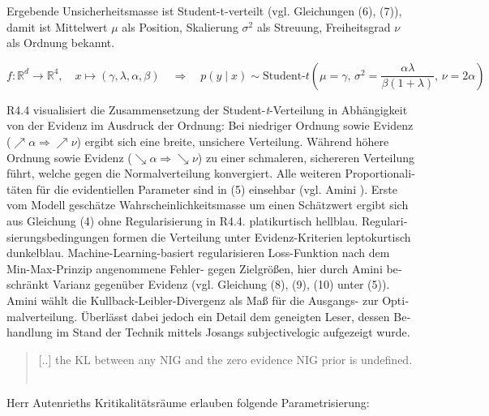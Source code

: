 \begin{otherlanguage}{ngerman}
Ergebende Unsicherheitsmasse ist Student-t-verteilt (vgl. Gleichungen (6), (7)), damit ist Mittelwert $\mu$ als \glqq{}Position\grqq{}, Skalierung $\sigma^{2}$ als \glqq{}Streuung\grqq{}, Freiheitsgrad $\nu$ als \glqq{}Ordnung\grqq{} bekannt. 

\[
f : \mathbb{R}^d \to \mathbb{R}^4, \quad x \mapsto (\gamma, \lambda, \alpha, \beta) \quad \Rightarrow \quad p(y \mid x) \sim \text{Student-}t\left(\mu = \gamma,\, \sigma^2 = \frac{\alpha \lambda}{\beta (1 + \lambda)},\, \nu = 2\alpha\right)
\]

R4.4 visualisiert die Zusammensetzung der Student-\emph{t}-Verteilung in Abhängigkeit von der Evidenz im Ausdruck der Ordnung: Bei niedriger Ordnung sowie Evidenz (\(\nearrow \alpha \Rightarrow \nearrow \nu\)) ergibt sich eine breite, unsichere Verteilung. Während höhere Ordnung sowie Evidenz (\(\searrow \alpha \Rightarrow \searrow \nu\)) zu einer schmaleren, sichereren Verteilung führt, welche gegen die Normalverteilung konvergiert. Alle weiteren Proportionalitäten für die evidentiellen Parameter sind in (5) einsehbar (vgl. Amini \parencite{amini2020}). Erste vom Modell geschätze Wahrscheinlichkeitsmasse um einen Schätzwert ergibt sich aus Gleichung (4) ohne Regularisierung in R4.4. platikurtisch hellblau. Regularisierungsbedingungen formen die Verteilung unter Evidenz-Kriterien leptokurtisch dunkelblau. Machine-Learning-basiert regularisieren Loss-Funktion nach dem Min-Max-Prinzip angenommene Fehler- gegen Zielgrößen, hier durch Amini beschränkt Varianz gegenüber Evidenz (vgl. Gleichung (8), (9), (10) unter (5)). Amini wählt die Kullback-Leibler-Divergenz als Maß für die Ausgangs- zur Optimalverteilung. Überlässt dabei jedoch ein Detail dem geneigten Leser, dessen Behandlung im Stand der Technik mittels Josangs \gls{subjectivelogic} aufgezeigt wurde.

\begin{quote}
  \glqq{}[..] the KL between any NIG and the zero evidence NIG prior is undefined.\grqq{} \newline ~\parencite[{S. 5, \glqq Minimizing evidence on errors \grqq, Z. 6 ff.}]{amini2020deep}
\end{quote}

Herr Autenrieths Kritikalitätsräume erlauben folgende Parametrisierung: 


\end{otherlanguage}
